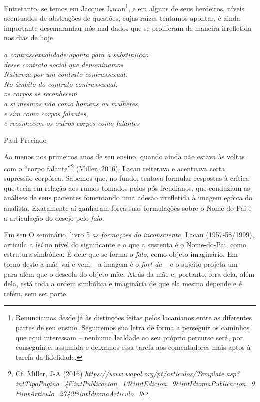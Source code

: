 Entretanto, se temos em Jacques Lacan\footnote{Renunciamos desde já às
  distinções feitas pelos lacanianos entre as diferentes partes de seu
  ensino. Seguiremos sua letra de forma a perseguir os caminhos que aqui
  interessam -- nenhuma lealdade ao seu próprio percurso será, por
  conseguinte, assumida e deixamos essa tarefa aos comentadores mais
  aptos à tarefa da fidelidade.}, e em alguns de seus herdeiros, níveis
acentuados de abstrações de questões, cujas raízes tentamos apontar, é
ainda importante desemaranhar nós mal dados que se proliferam de maneira
irrefletida nos dias de hoje.

\asterisc

\epigraph{\emph{a contrassexualidade aponta para a substituição\\
desse contrato social que denominamos\\
Natureza por um contrato contrassexual.\\
No âmbito do contrato contrassexual,\\
os corpos se reconhecem\\
a si mesmos não como homens ou mulheres,\\
e sim como corpos falantes,\\
e reconhecem os outros corpos como falantes}}{Paul Preciado}

Ao menos nos primeiros anos de seu ensino, quando ainda não estava às
voltas com o ``corpo falante''\footnote{Cf. Miller, J-A (2016)
  \emph{https://www.wapol.org/pt/articulos/Template.asp?intTipoPagina=4\&intPublicacion=13\&intEdicion=9\&intIdiomaPublicacion=9\&intArticulo=2742\&intIdiomaArticulo=9}}
(Miller, 2016), Lacan reiterava e acentuava certa supressão corpórea.
Sabemos que, no fundo, tentava formular respostas à crítica que tecia em
relação aos rumos tomados pelos pós-freudianos, que conduziam as
análises de seus pacientes fomentando uma adesão irrefletida à imagem
egóica do analista. Exatamente aí ganharam força suas formulações sobre
o Nome-do-Pai e a articulação do desejo pelo \emph{falo. }

Em seu O seminário, livro 5 \emph{as formações do inconsciente,} Lacan
(1957-58/1999), articula a \emph{lei} no nível do significante e o que a
sustenta é o Nome-do-Pai, como estrutura simbólica. É dele que se forma
o \emph{falo}, como objeto imaginário. Em torno deste a mãe vai e vem --
a imagem é o \emph{fort-da} -- e o sujeito projeta um para-além que o
descola do objeto-mãe. Atrás da mãe e, portanto, fora dela, além dela,
está toda a ordem simbólica e imaginária de que ela mesma depende e é
refém, sem ser parte.

